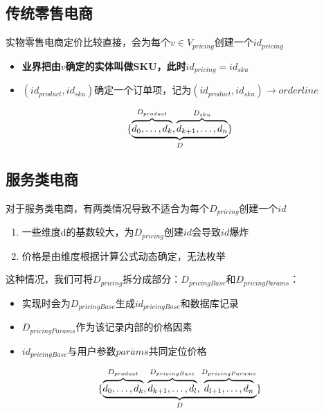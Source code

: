 \documentclass[a4paper]{article}
\begin{document}
\subsection{传统零售电商}
实物零售电商定价比较直接，会为每个$v \in V_{pricing}$创建一个$id_{pricing}$
\begin{itemize}
    \item \textbf{业界把由$v$确定的实体叫做SKU，此时$id_{pricing}=id_{sku}$}
    \item $(id_{product}, id_{sku})$确定一个订单项，记为$(id_{product}, id_{sku}) \longrightarrow orderline$
\end{itemize}
\begin{equation}
    \{\underbrace{%
        \overbrace{\mathstrut d_0,\ldots,d_k}^{D_{product}},
        \overbrace{\mathstrut d_{k+1},\ldots,d_n}^{D_{sku}}}
    _{D} \}
\end{equation}
        
\subsection{服务类电商}
对于服务类电商，有两类情况导致不适合为每个$D_{pricing}$创建一个$id$
\begin{enumerate}
    \item 一些维度d的基数较大，为$D_{pricing}$创建$id$会导致$id$爆炸
    \item 价格是由维度根据计算公式动态确定，无法枚举
\end{enumerate}
这种情况，我们可将$D_{pricing}$拆分成部分：$D_{pricingBase}$和$D_{pricingParams}$：
\begin{itemize}
    \item 实现时会为$D_{pricingBase}$生成$id_{pricingBase}$和数据库记录
    \item $D_{pricingParams}$作为该记录内部的价格因素
    \item $id_{pricingBase}$与用户参数$\overline{params}$共同定位价格
\end{itemize}
\begin{equation}
    \{\underbrace{%
        \overbrace{\mathstrut d_0,\ldots,d_k}^{D_{product}},
        \overbrace{\mathstrut d_{k+1},\ldots,d_l}^{D_{pricingBase}},
        \overbrace{\mathstrut d_{l+1},\ldots,d_n}^{D_{pricingParams}}
    }
    _{D} \}
\end{equation}
\end{document}
